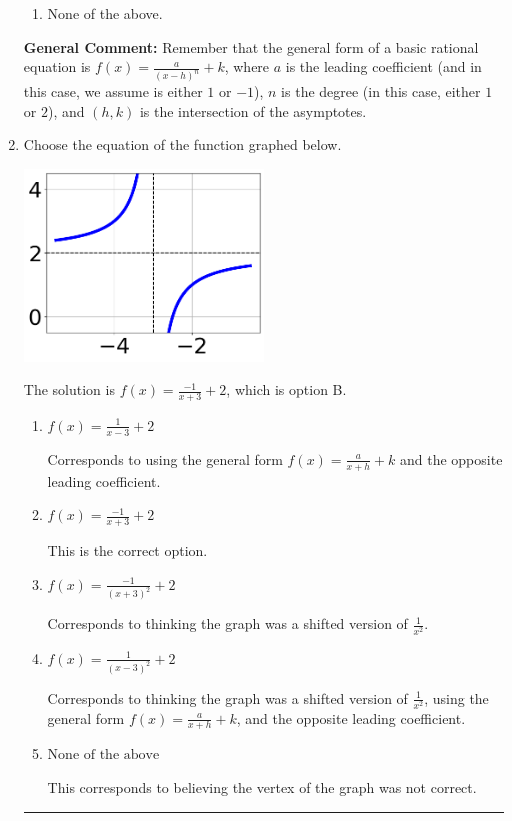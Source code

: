 \documentclass{extbook}[14pt]
\newcommand{\litem}[1]{\item #1

\rule{\textwidth}{0.4pt}}
\begin{document}
\begin{enumerate}
{\begin{enumerate}[label=\Alph*.]
\begin{multicols}{2}
\end{multicols}\item None of the above.\end{enumerate}
\textbf{General Comment:} Remember that the general form of a basic rational equation is $ f(x) = \frac{a}{(x-h)^n} + k$, where $a$ is the leading coefficient (and in this case, we assume is either $1$ or $-1$), $n$ is the degree (in this case, either $1$ or $2$), and $(h, k)$ is the intersection of the asymptotes.
}
\litem{
Choose the equation of the function graphed below.

\begin{center}
    \includegraphics[width=0.5\textwidth]{../Figures/rationalGraphToEquationCopyC.png}
\end{center}


The solution is \( f(x) = \frac{-1}{x + 3} + 2 \), which is option B.\begin{enumerate}[label=\Alph*.]
\item \( f(x) = \frac{1}{x - 3} + 2 \)

Corresponds to using the general form $f(x) = \frac{a}{x+h}+k$ and the opposite leading coefficient.
\item \( f(x) = \frac{-1}{x + 3} + 2 \)

This is the correct option.
\item \( f(x) = \frac{-1}{(x + 3)^2} + 2 \)

Corresponds to thinking the graph was a shifted version of $\frac{1}{x^2}$.
\item \( f(x) = \frac{1}{(x - 3)^2} + 2 \)

Corresponds to thinking the graph was a shifted version of $\frac{1}{x^2}$, using the general form $f(x) = \frac{a}{x+h}+k$, and the opposite leading coefficient.
\item \( \text{None of the above} \)

This corresponds to believing the vertex of the graph was not correct.
\end{enumerate}

}
\end{enumerate}
\end{document}
